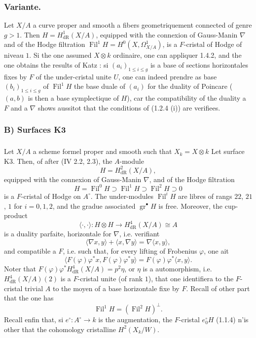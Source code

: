 \documentclass[12pt,a4paper]{article}
\theoremstyle{plain}
\theoremstyle{definition}
\theoremstyle{remark}
\DeclareMathOperator{\Fil}{Fil}
\DeclareMathOperator{\gr}{gr}
\begin{document}
\subsubsection{Variante.}
Let $X/A$ a curve proper and smooth a fibers geometriquement connected of genre $g > 1$. Then $H = H^1_\mathrm{dR}(X/A)$, equipped with the connexion of Gauss-Manin $\nabla$ and of the Hodge filtration $\Fil^1 H = H^0(X, \Omega^1_{X/A})$, is a $F$-cristal of Hodge of niveau $1$. Si the one assumed $X \otimes k$ ordinaire, one can appliquer 1.4.2, and the one obtains the results of Katz \cite[\S 8]{Katz1973}: si $(a_i)_{1\leqslant i\leqslant g}$ is a base of sections horizontales fixes by $F$ of the under-cristal unite $U$, one can indeed prendre as base $(b_i)_{1\leqslant i\leqslant g}$ of $\Fil^1 H$ the base duale of $(a_i)$ for the duality of Poincare ($(a, b)$ is then a base symplectique of $H$), car the compatibility of the duality a $F$ and a $\nabla$ shows aussitot that the conditions of (1.2.4 (i)) are verifiees.

\subsubsection{B) Surfaces K3}

\setcounter{subsubsection}{4}

\subsubsection{}
Let $X/A$ a scheme formel proper and smooth such that $X_k = X \otimes k$ Let surface K3. Then, of after (IV 2.2, 2.3), the $A$-module
\[
H = H^2_\mathrm{dR}(X/A),
\]
equipped with the connexion of Gauss-Manin $\nabla$, and of the Hodge filtration
\[
H = \Fil^0 H \supset \Fil^1 H \supset \Fil^2 H \supset 0
\]
is a $F$-cristal of Hodge on $A^\circ$. The under-modules $\Fil^i H$ are libres of rangs $22$, $21$, $1$ for $i = 0, 1, 2$, and the gradue associated $\gr^\bullet H$ is free. Moreover, the cup-product
\[
\langle \cdot, \cdot \rangle : H \otimes H \longrightarrow H^4_\mathrm{dR}(X/A) \cong A
\]
is a duality parfaite, horizontale for $\nabla$, i.e. verifiant
\[
\langle \nabla x, y \rangle + \langle x, \nabla y \rangle = \nabla\langle x, y \rangle,
\]
and compatible a $F$, i.e. such that, for every lifting of Frobenius $\varphi$, one ait
\[
\langle F(\varphi)\varphi^* x, F(\varphi)\varphi^* y \rangle = F(\varphi)\varphi^*\langle x, y \rangle.
\]
Noter that $F(\varphi)\varphi^* H^4_\mathrm{dR}(X/A) = p^2 \eta$, or $\eta$ is a automorphism, i.e. $H^4_\mathrm{dR}(X/A)(2)$ is a $F$-cristal unite (of rank $1$), that one identifiera to the $F$-cristal trivial $A$ to the moyen of a base horizontale fixe by $F$. Recall of other part that the one has
\[
\Fil^1 H = (\Fil^2 H)^\perp.
\]
Recall enfin that, si $e^\circ : A^\circ \to k$ is the augmentation, the $F$-cristal $e^\circ_0 H$ (1.1.4) n'is other that the cohomology cristalline $H^2(X_k/W)$.
\end{document}
